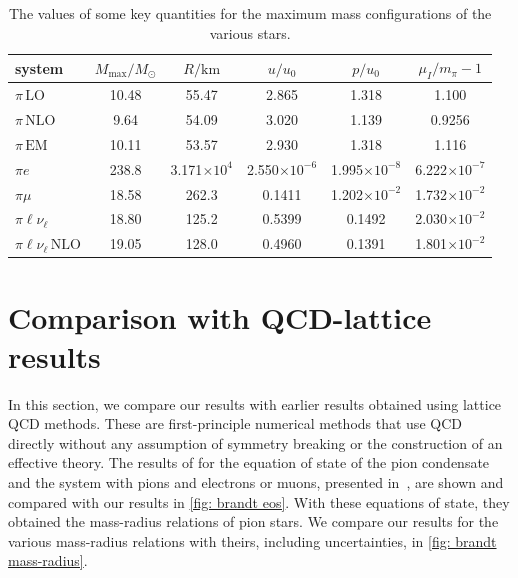 \begin{table}[H]
    \centering
    \caption{The values of some key quantities for the maximum mass configurations of the various stars.}
    \label{table: key values}
    \begin{tabular}{l  c  c  c  c  c}
        \hline \hline
        system & $M_\text{max}/M_\odot$ & $R / \text{km}$ & 
        $u/u_0$ & $p/u_0$ & $\mu_I/m_\pi-1$ \\
        \hline
        $\pi\, \text{LO}$& 10.48 & 55.47 & 2.865 & 1.318 & 1.100 \\
        $\pi\, \text{NLO}$& 9.64 & 54.09 & 3.020 & 1.139 & 0.9256 \\
        $\pi\, \text{EM}$& 10.11 & 53.57 & 2.930 & 1.318 & 1.116 \\
        $\pi e$& 238.8 & 3.171$\times10^4$ & 
        2.550$\times10^{-6}$ & 1.995$\times10^{-8}$ & 
        6.222$\times10^{-7}$ \\
        $\pi \mu$& 18.58 & 262.3 & 
        0.1411 & 1.202$\times 10^{-2}$ &
        1.732$\times10^{-2}$ \\
        $\pi  \ell  \nu_\ell$& 18.80 & 125.2 &
        0.5399  & 0.1492 &
        2.030$\times10^{-2}$ \\
        $\pi  \ell \nu_\ell\,\text{NLO}$& 19.05 & 128.0 &
        0.4960  & 0.1391 &
        1.801$\times10^{-2}$ \\
        \hline
    \end{tabular}
\end{table}




\section{Comparison with QCD-lattice results}


In this section, we compare our results with earlier results obtained using lattice QCD methods.
These are first-principle numerical methods that use QCD directly without any assumption of symmetry breaking or the construction of an effective theory.
The results of \citeauthor{brandtNewClassCompact2018} for the equation of state of the pion condensate and the system with pions and electrons or muons, presented in~\autocite{brandtNewClassCompact2018}, are shown and compared with our results in \autoref{fig: brandt eos}.
With these equations of state, they obtained the mass-radius relations of pion stars.
We compare our results for the various mass-radius relations with theirs, including uncertainties, in \autoref{fig: brandt mass-radius}. 

